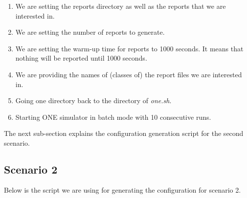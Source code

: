 \begin{enumerate}
  \item We are setting the reports directory as well as the reports that we are interested in.
  \item We are setting the number of reports to generate.
  \item We are setting the warm-up time for reports to 1000 seconds. It means that nothing will be reported until 1000 seconds.
  \item We are providing the names of (classes of) the report files we are interested in.
  \item Going one directory back to the directory of \textit{one.sh}.
  \item Starting ONE simulator in batch mode with 10 consecutive runs.

\end{enumerate}

The next sub-section explains the configuration generation script for the second scenario.
\subsection{Scenario 2}
Below is the script we are using for generating the configuration for scenario 2.

